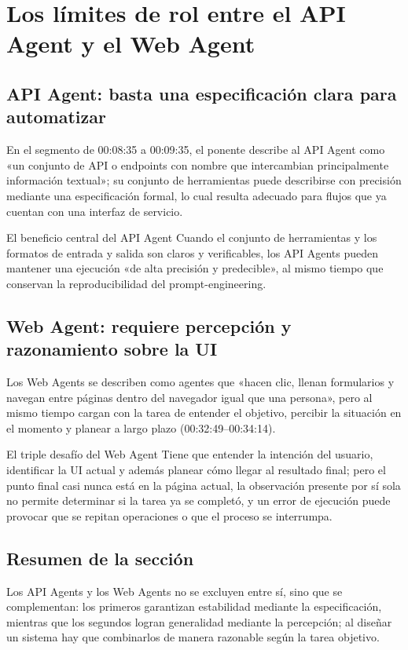 \section{Los límites de rol entre el API Agent y el Web Agent}
\subsection{API Agent: basta una especificación clara para automatizar}
En el segmento de 00:08:35 a 00:09:35, el ponente describe al API Agent como «un conjunto de API o endpoints con nombre que intercambian principalmente información textual»; su conjunto de herramientas puede describirse con precisión mediante una especificación formal, lo cual resulta adecuado para flujos que ya cuentan con una interfaz de servicio.

\begin{knowledgebox}{El beneficio central del API Agent}
Cuando el conjunto de herramientas y los formatos de entrada y salida son claros y verificables, los API Agents pueden mantener una ejecución «de alta precisión y predecible», al mismo tiempo que conservan la reproducibilidad del prompt-engineering.
\end{knowledgebox}

\subsection{Web Agent: requiere percepción y razonamiento sobre la UI}
Los Web Agents se describen como agentes que «hacen clic, llenan formularios y navegan entre páginas dentro del navegador igual que una persona», pero al mismo tiempo cargan con la tarea de entender el objetivo, percibir la situación en el momento y planear a largo plazo (00:32:49--00:34:14).

\begin{warningbox}{El triple desafío del Web Agent}
Tiene que entender la intención del usuario, identificar la UI actual y además planear cómo llegar al resultado final; pero el punto final casi nunca está en la página actual, la observación presente por sí sola no permite determinar si la tarea ya se completó, y un error de ejecución puede provocar que se repitan operaciones o que el proceso se interrumpa.
\end{warningbox}

\subsection{Resumen de la sección}
Los API Agents y los Web Agents no se excluyen entre sí, sino que se complementan: los primeros garantizan estabilidad mediante la especificación, mientras que los segundos logran generalidad mediante la percepción; al diseñar un sistema hay que combinarlos de manera razonable según la tarea objetivo.

